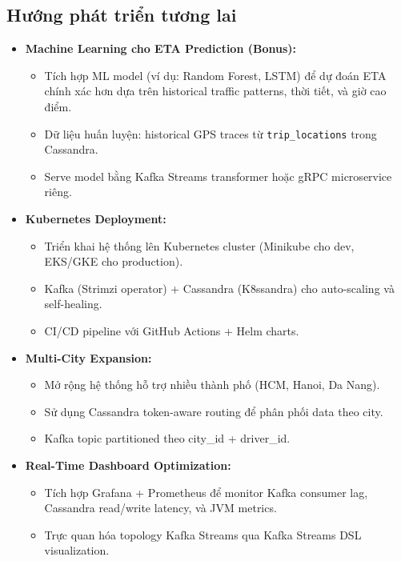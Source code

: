 \subsection{Hướng phát triển tương lai}
\label{sec:future}

\bigskip
\begin{itemize}
    \item \textbf{Machine Learning cho ETA Prediction (Bonus):}
    \begin{itemize}
        \item Tích hợp ML model (ví dụ: Random Forest, LSTM) để dự đoán ETA chính xác hơn dựa trên historical traffic patterns, thời tiết, và giờ cao điểm.
        \item Dữ liệu huấn luyện: historical GPS traces từ \texttt{trip\_locations} trong Cassandra.
        \item Serve model bằng Kafka Streams transformer hoặc gRPC microservice riêng.
    \end{itemize}

    \item \textbf{Kubernetes Deployment:}
    \begin{itemize}
        \item Triển khai hệ thống lên Kubernetes cluster (Minikube cho dev, EKS/GKE cho production).
        \item Kafka (Strimzi operator) + Cassandra (K8ssandra) cho auto-scaling và self-healing.
        \item CI/CD pipeline với GitHub Actions + Helm charts.
    \end{itemize}

    \item \textbf{Multi-City Expansion:}
    \begin{itemize}
        \item Mở rộng hệ thống hỗ trợ nhiều thành phố (HCM, Hanoi, Da Nang).
        \item Sử dụng Cassandra token-aware routing để phân phối data theo city.
        \item Kafka topic partitioned theo city\_id + driver\_id.
    \end{itemize}

    \item \textbf{Real-Time Dashboard Optimization:}
    \begin{itemize}
        \item Tích hợp Grafana + Prometheus để monitor Kafka consumer lag, Cassandra read/write latency, và JVM metrics.
        \item Trực quan hóa topology Kafka Streams qua Kafka Streams DSL visualization.
    \end{itemize}


\end{itemize}
